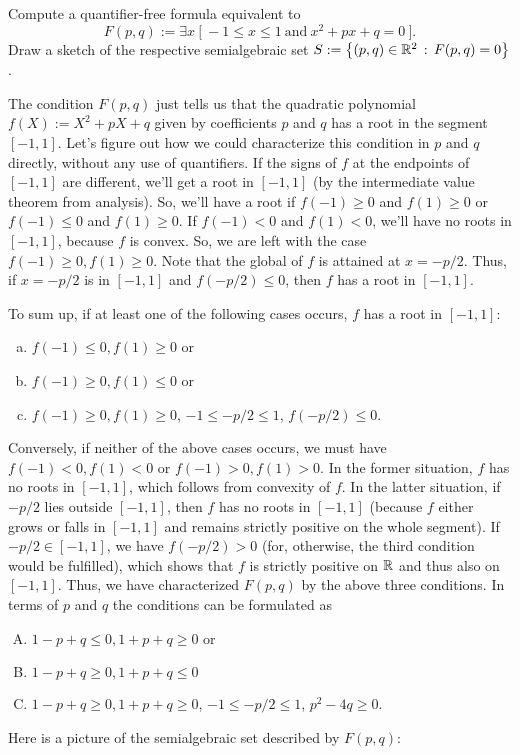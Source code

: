 \begin{exercise}
	Compute a quantifier-free formula equivalent to 
	\[
		F(p,q) := \exists x \ \bigl[ \ -1 \le x \le 1 \  \text{and} \ x^2 + p x + q = 0  \ \bigr].
	\]
	Draw a sketch of the respective semialgebraic set $S:= \left\{ (p,q) \in \mathbb{R}^2 \,:\, F(p,q) =0 \right\}$. 
\end{exercise}
\begin{solution}
	The condition $F(p,q)$ just tells us that the quadratic polynomial $f(X):=X^2 + p X + q$ given by coefficients $p$ and $q$ has a root in the segment $[-1,1]$. Let's figure out how we could characterize this condition in $p$ and $q$ directly, without any use of quantifiers. If the signs of $f$ at the endpoints of $[-1,1]$ are different, we'll get a root in $[-1,1]$ (by the intermediate value theorem from analysis). So, we'll have a root if $f(-1) \ge 0$ and $f(1) \ge 0$ or $f(-1) \le 0$ and $f(1) \ge 0$. If $f(-1) < 0$ and $f(1) < 0$, we'll have no roots in $[-1,1]$, because $f$ is convex. So, we are left with the case $f(-1) \ge 0, f(1) \ge 0$. Note that the global  of $f$ is attained at $x = -p/2$. Thus, if $x = -p/2$ is in $[-1,1]$ and $f(-p/2) \le 0$, then $f$ has a root in $[-1,1]$. 
	
	To sum up, if at least one of the following cases occurs, $f$ has a root in $[-1,1]$:
	\begin{enumerate}[(a)]
		\item $f(-1) \le 0, f(1) \ge 0$ or 
		\item $f(-1) \ge 0, f(1) \le 0$ or 
		\item $f(-1) \ge 0, f(1) \ge 0$, $-1 \le -p/2 \le 1$, $f(-p/2) \le 0$.
	\end{enumerate}
	Conversely, if neither of the above cases occurs, we must have $f(-1)<0, f(1) < 0$ or $f(-1) > 0, f(1) > 0$. In the former situation, $f$ has no roots in $[-1,1]$, which follows from convexity of $f$. In the latter situation, if $-p/2$ lies outside $[-1,1]$, then $f$ has no roots in $[-1,1]$ (because $f$ either grows or falls in $[-1,1]$ and remains strictly positive on the whole segment). If $-p/2 \in [-1,1]$, we have $f(-p/2) > 0$ (for, otherwise, the third condition would be fulfilled), which shows that $f$ is strictly positive on $\mathbb{R}$ and thus also on $[-1,1]$. Thus, we have characterized $F(p,q)$ by the above three conditions. In terms of $p$ and $q$ the conditions can be formulated as 
	\begin{enumerate}[(A)]
		\item $1 - p + q \le 0, 1 + p + q \ge 0$ or 
		\item $1 - p + q \ge 0, 1 + p + q \le 0$
		\item $1 - p+ q \ge 0, 1 + p + q \ge 0$, $-1 \le -p/2 \le 1$, $p^2 - 4 q \ge 0$. 
	\end{enumerate}
	Here is a picture of the semialgebraic set described by $F(p,q)$: 
	\begin{center}
\end{center}
\end{solution}
